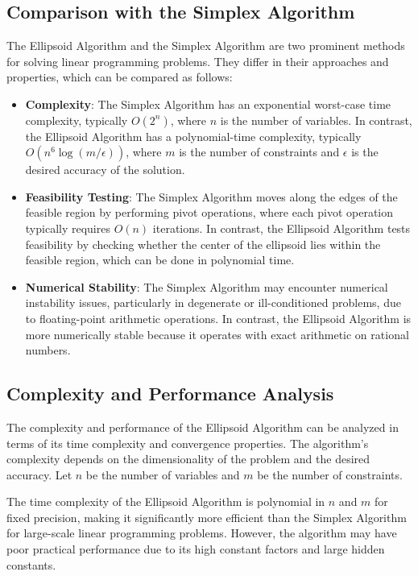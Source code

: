 \documentclass[12pt]{book} %
\begin{document}
\subsection{Comparison with the Simplex Algorithm}

The Ellipsoid Algorithm and the Simplex Algorithm are two prominent methods for solving linear programming problems. They differ in their approaches and properties, which can be compared as follows:

\begin{itemize}
    \item \textbf{Complexity}: The Simplex Algorithm has an exponential worst-case time complexity, typically \(O(2^n)\), where \(n\) is the number of variables. In contrast, the Ellipsoid Algorithm has a polynomial-time complexity, typically \(O(n^6 \log(m/\epsilon))\), where \(m\) is the number of constraints and \(\epsilon\) is the desired accuracy of the solution.
    
    \item \textbf{Feasibility Testing}: The Simplex Algorithm moves along the edges of the feasible region by performing pivot operations, where each pivot operation typically requires \(O(n)\) iterations. In contrast, the Ellipsoid Algorithm tests feasibility by checking whether the center of the ellipsoid lies within the feasible region, which can be done in polynomial time.
    
    \item \textbf{Numerical Stability}: The Simplex Algorithm may encounter numerical instability issues, particularly in degenerate or ill-conditioned problems, due to floating-point arithmetic operations. In contrast, the Ellipsoid Algorithm is more numerically stable because it operates with exact arithmetic on rational numbers.
\end{itemize}


\subsection{Complexity and Performance Analysis}

The complexity and performance of the Ellipsoid Algorithm can be analyzed in terms of its time complexity and convergence properties. The algorithm's complexity depends on the dimensionality of the problem and the desired accuracy. Let \(n\) be the number of variables and \(m\) be the number of constraints.

The time complexity of the Ellipsoid Algorithm is polynomial in \(n\) and \(m\) for fixed precision, making it significantly more efficient than the Simplex Algorithm for large-scale linear programming problems. However, the algorithm may have poor practical performance due to its high constant factors and large hidden constants.
\end{document}
